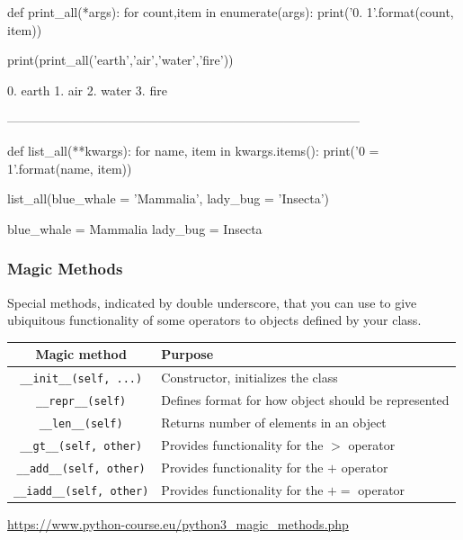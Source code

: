 \documentclass[table,dvipsnames]{beamer}
\begin{document}
\begin{frame}[fragile]

\begin{code}
def print_all(*args):
    for count,item in enumerate(args):
        print('{0}. {1}'.format(count, item))

print(print_all('earth','air','water','fire'))
\end{code}

\begin{codeout}
0. earth
1. air
2. water
3. fire
\end{codeout}
------------------------------------------------------------------------------------
\begin{code}
def list_all(**kwargs):
    for name, item in kwargs.items():
        print('{0} = {1}'.format(name, item))

list_all(blue_whale = 'Mammalia', lady_bug = 'Insecta')
\end{code}

\begin{codeout}
blue_whale = Mammalia
lady_bug = Insecta
\end{codeout}
\end{frame}

\begin{frame}[fragile]
 
\frametitle{Magic Methods}
\footnotesize

Special methods, indicated by double underscore, that you can use to give
ubiquitous functionality of some operators to objects defined by your class.

\begin{table}
    \begin{tabular}{|c|l|}
    \hline
    Magic method                       & Purpose \\
    \hline
    \texttt{\_\_init\_\_(self, ...)}   & Constructor, initializes the class \\
    \texttt{\_\_repr\_\_(self)}        & Defines format for how object should be represented \\
    \texttt{\_\_len\_\_(self)}         & Returns number of elements in an object \\
    \texttt{\_\_gt\_\_(self, other)}   & Provides functionality for the $>$ operator \\
    \texttt{\_\_add\_\_(self, other)}  & Provides functionality for the $+$ operator \\
    \texttt{\_\_iadd\_\_(self, other)} & Provides functionality for the $+=$ operator \\ 
    \hline
    \end{tabular}
\end{table}
\vspace{1cm}
\begin{flushleft}
 \tiny \href{https://www.python-course.eu/python3\_magic\_methods.php}{https://www.python-course.eu/python3\_magic\_methods.php}
\end{flushleft}
\end{frame}
\end{document}
